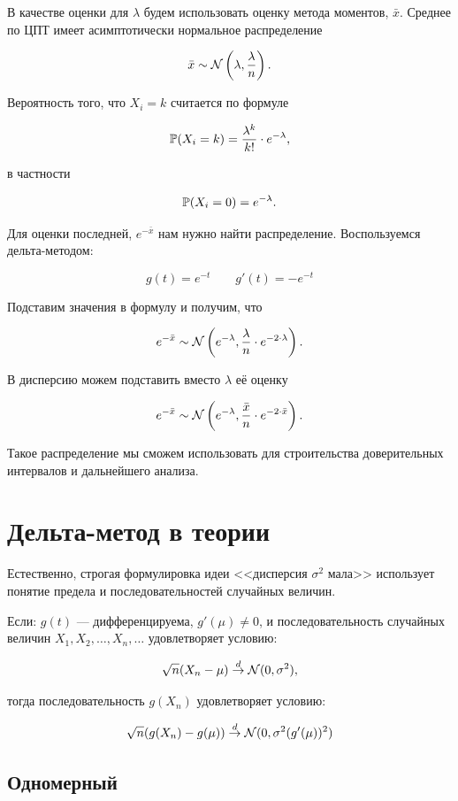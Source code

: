 \documentclass[12pt, a4paper, oneside]{article}
\begin{document}
\begin{sol}
В качестве оценки для $\lambda$ будем использовать оценку метода моментов, $\bar{x}$.  Среднее по ЦПТ имеет асимптотически нормальное распределение

$$
\bar{x}\sim \mathcal{N} \left(\lambda, \frac{\lambda}{n} \right).
$$

Вероятность того, что $X_i = k$ считается по формуле 

$$
\mathbb{P}(X_i = k) = \frac{\lambda^k}{k!} \cdot e^{-\lambda},
$$ 

в частности 

$$
\mathbb{P}(X_i = 0) = e^{-\lambda}.
$$

Для оценки последней, $e^{-\bar{x}}$ нам нужно найти распределение. Воспользуемся  дельта-методом:

$$
g(t) = e^{-t} \qquad g'(t) = -e^{-t}
$$

Подставим значения в формулу и получим, что 

$$
e^{-\bar{x}} \sim \mathcal{N} \left( e^{-\lambda},  \frac{\lambda}{n} \cdot e^{-2 \cdot \lambda}  \right).
$$

В дисперсию можем подставить вместо $\lambda$ её оценку

$$
e^{-\bar{x}} \sim \mathcal{N} \left( e^{-\lambda},  \frac{\bar{x}}{n} \cdot e^{-2 \cdot \bar{x}}  \right).
$$

Такое распределение мы сможем использовать для строительства доверительных интервалов и дальнейшего анализа.
\end{sol}


\section*{Дельта-метод в теории}

Естественно, строгая формулировка идеи <<дисперсия $\sigma^2$ мала>> использует понятие предела и последовательностей случайных величин.

Если:  $g(t)$ --- дифференцируема, $g'(\mu)\neq 0$, и последовательность случайных величин $X_1, X_2, \ldots, X_n, \ldots $ удовлетворяет условию:

\[
\sqrt{n} (X_n - \mu) \overset{d}{\to}  \mathcal{N}(0,\sigma^2),
\]

тогда последовательность $g(X_n)$ удовлетворяет условию:

\[
\sqrt{n} (g(X_n) - g(\mu)) \overset{d}{\to} \mathcal{N}(0,\sigma^2 (g'(\mu))^2 )
\]




\subsection{Одномерный} 
\end{document}
